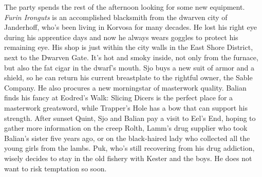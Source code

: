 The party spends the rest of the afternoon looking for some new equipment. {\itshape Furin Ironguts} is an accomplished blacksmith from the dwarven city of Janderhoff, who's been living in Korvosa for many decades. He lost his right eye during his apprentice days and now he always wears goggles to protect his remaining eye. His shop is just within the city walls in the East Shore District, next to the Dwarven Gate. It's hot and smoky inside, not only from the furnace, but also the fat cigar in the dwarf's mouth. Sjo buys a new suit of armor and a shield, so he can return his current breastplate to the rightful owner, the Sable Company. He also procures a new morningstar of masterwork quality. Balian finds his fancy at Eodred's Walk: Slicing Dicers is the perfect place for a masterwork greatsword, while Trapper's Hole has a bow that can support his strength. After sunset Quint, Sjo and Balian pay a visit to Eel's End, hoping to gather more information on the creep Rolth, Lamm's drug supplier who took Balian's sister five years ago, or on the black-haired lady who collected all the young girls from the lambs. Puk, who's still recovering from his drug addiction, wisely decides to stay in the old fishery with Kester and the boys. He does not want to risk temptation so soon.\\

